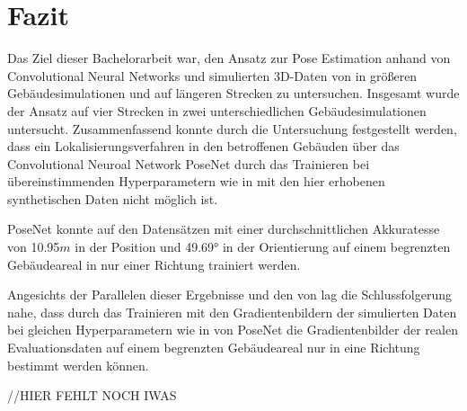 
\section{Fazit}
\label{sec:kapitel_6}
Das Ziel dieser Bachelorarbeit war, den Ansatz zur Pose Estimation anhand von Convolutional Neural Networks und simulierten 3D-Daten von \citet{acharyaBIMPoseNetIndoorCamera2019} in größeren Gebäudesimulationen und auf längeren Strecken zu untersuchen.
Insgesamt wurde der Ansatz auf vier Strecken in zwei unterschiedlichen Gebäudesimulationen untersucht. Zusammenfassend konnte durch die Untersuchung festgestellt werden, dass ein Lokalisierungsverfahren in den betroffenen Gebäuden über das Convolutional Neuroal Network PoseNet durch das Trainieren bei übereinstimmenden Hyperparametern wie in \cite{acharyaBIMPoseNetIndoorCamera2019} mit den hier erhobenen synthetischen Daten nicht möglich ist. 

PoseNet konnte auf den Datensätzen mit einer durchschnittlichen Akkuratesse von 10.95$m$ in der Position und 49.69° in der Orientierung auf einem begrenzten Gebäudeareal in nur einer Richtung trainiert werden. 

Angesichts der Parallelen dieser Ergebnisse und den von \citet{acharyaBIMPoseNetIndoorCamera2019} lag die Schlussfolgerung nahe, dass durch das Trainieren mit den Gradientenbildern der simulierten Daten bei gleichen Hyperparametern wie in \cite{acharyaBIMPoseNetIndoorCamera2019} von PoseNet die Gradientenbilder der realen Evaluationsdaten auf einem begrenzten Gebäudeareal nur in eine Richtung bestimmt werden können.

//HIER FEHLT NOCH IWAS